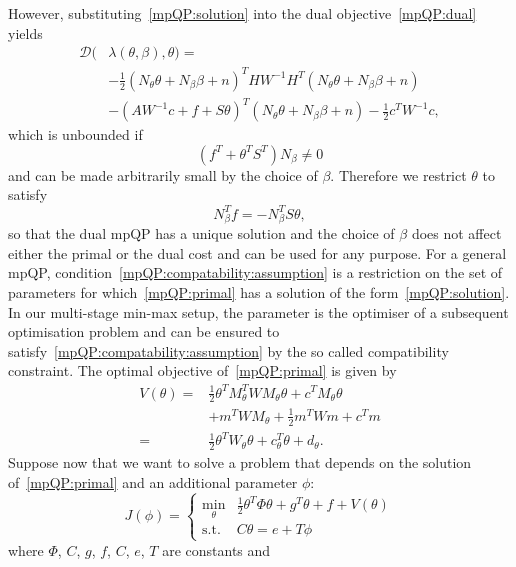 \documentclass{ifacconf}
\begin{document}
However, substituting~\eqref{mpQP:solution} into the dual objective~\eqref{mpQP:dual} yields
\begin{align*}
\mathcal D(&\lambda(\theta,\beta),\theta) = \\
& {-\tfrac{1}{2}}(N_\theta \theta + N_\beta \beta + n)^T H W^{-1}H^T 
	(N_\theta \theta + N_\beta \beta + n)\\
& -(AW^{-1}c + 
	f + S\theta)^T(N_\theta \theta + N_\beta \beta + n) -\tfrac{1}{2}c^TW^{-1}c,
\end{align*}
which is unbounded if
\[
	(f^T+\theta^TS^T)N_\beta \neq 0
\]
and can be made arbitrarily small by the choice of $\beta$. Therefore we restrict $\theta$ to satisfy 
\begin{equation}\label{mpQP:compatability:assumption}
	N_\beta^Tf = -N_\beta^TS\theta,
\end{equation} 
so that the dual mpQP has a unique solution
and the choice of $\beta$ does not affect either the primal or the dual cost and can be used for
any purpose. For a general mpQP, condition~\eqref{mpQP:compatability:assumption} is a restriction on the set
of parameters for which~\eqref{mpQP:primal} has a solution of the form~\eqref{mpQP:solution}.
In our multi-stage min-max setup, the parameter is the optimiser of a subsequent optimisation
problem and can be ensured to satisfy~\eqref{mpQP:compatability:assumption} by the so called 
compatibility constraint. The optimal objective of~\eqref{mpQP:primal} is given by
\begin{equation}\label{mpQP:cost:to:go}\begin{split}
	V(\theta) = &\frac{1}{2}\theta^T M_\theta^T W M_\theta \theta + c^TM_\theta \theta \\
& + m^TWM_\theta+\frac{1}{2}m^T Wm + c^Tm\\
=&\frac{1}{2} \theta^T W_\theta \theta + c^T_\theta \theta + d_\theta.
\end{split}\end{equation}
%
Suppose now that we want to solve a problem that depends on the solution of~\eqref{mpQP:primal} and an
additional parameter $\phi$:
\begin{equation}\label{mpQP:second:stage} 
	J(\phi) = \left\{\begin{array}{rl}
	\min_\theta & \frac{1}{2}\theta^T\Phi\theta + g^T\theta + f + V(\theta)\\
	\text{s.t.} & C\theta = e+T\phi
	\end{array}\right.
\end{equation}
where $\Phi$, $C$, $g$, $f$, $C$, $e$, $T$ are constants and
\end{document}
